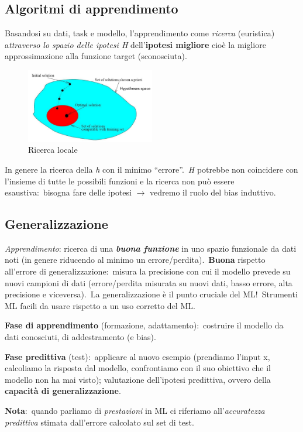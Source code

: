 \subsection{Algoritmi di apprendimento}

Basandosi su dati, task e modello, l'apprendimento come \textit{ricerca} (euristica) a\textit{ttraverso lo spazio delle ipotesi H} dell'\textbf{ipotesi migliore} cioè la migliore approssimazione alla funzione target (sconosciuta).\
\begin{figure}[H]
	\centering
	\includegraphics[width=0.5\textwidth]{immagini/ML_search.png}
	\caption*{Ricerca locale}
\end{figure}

\noindent In genere la ricerca della \textit{h} con il minimo ``errore''.\
\textit{H} potrebbe non coincidere con l'insieme di tutte le possibili funzioni e la ricerca non può essere esaustiva:\ bisogna fare delle ipotesi $\rightarrow$ vedremo il ruolo del bias induttivo.

\subsection{Generalizzazione}

\textit{Apprendimento}: ricerca di una \textbf{\textit{buona funzione}} in uno spazio funzionale da dati noti (in genere riducendo al minimo un errore/perdita).\
\textbf{Buona} rispetto all'errore di generalizzazione:\ misura la precisione con cui il modello prevede su nuovi campioni di dati (errore/perdita misurata su nuovi dati, basso errore, alta precisione e viceversa).\
La generalizzazione è il punto cruciale del ML!\
Strumenti ML facili da usare rispetto a un uso corretto del ML.

\noindent\textbf{Fase di apprendimento} (formazione, adattamento):\ costruire il modello da dati conosciuti, di addestramento (e bias).\

\noindent\textbf{Fase predittiva} (test):\ applicare al nuovo esempio (prendiamo l'input x, calcoliamo la risposta dal modello, confrontiamo con il suo obiettivo che il modello non ha mai visto); valutazione dell'ipotesi predittiva, ovvero della \textbf{capacità di generalizzazione}.\

\textbf{Nota}:\ quando parliamo di \textit{prestazioni} in ML ci riferiamo all'\textit{accuratezza predittiva} stimata dall'errore calcolato sul set di test.\
